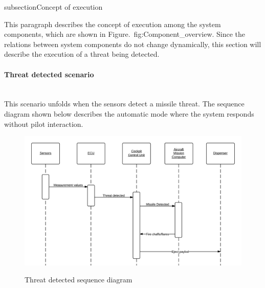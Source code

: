 subsection{Concept of execution}

This paragraph describes the concept of execution among the system components, which are shown in Figure.~{fig:Component_overview}. Since the relations between system 
components do not change dynamically, this section will describe the execution of a threat being detected.

\paragraph{Threat detected scenario}\mbox{}\\
This scenario unfolds when the sensors detect a missile threat. The sequence diagram shown below describes the automatic mode where the system responds without pilot 
interaction.

\begin{figure}[h]
	\centering
	\includegraphics[scale=0.55]{./images/threatDetectedSequenceDiagram.png}\\
	\caption{Threat detected sequence diagram}
    \label{fig:threatDetectedSeqDia}
\end{figure}


